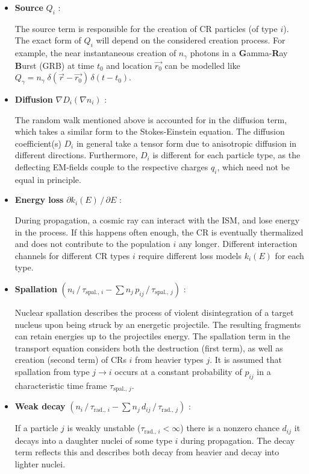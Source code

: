 \begin{itemize}
	\item \textbf{Source} $Q_i$ :

	The source term is responsible for the creation of CR particles (of type $i$). The exact form of $Q_i$ will depend on the considered creation process. For 
	example, the near instantaneous creation of $n_\gamma$ photons in a \textbf{G}amma-\textbf{R}ay \textbf{B}urst (GRB) at time $t_0$ and location $\vec{r_0}$ can 
	be modelled like $Q_\gamma = n_\gamma \; \delta(\vec{r} - \vec{r_0}) \, \delta(t - t_0)$.

	\item \textbf{Diffusion} $\nabla D_i \left( \nabla n_i \right)$ :

	The random walk mentioned above is accounted for in the diffusion term, which takes a similar form to the Stokes-Einstein equation. The diffusion 
	coefficient(s) $D_i$ in general take a tensor form due to anisotropic diffusion in different directions. Furthermore, $D_i$ is different for each particle 
	type, as the deflecting EM-fields couple to the respective charges $q_i$, which need not be equal in principle.

	\item \textbf{Energy loss} $\partial k_i(E)\,/\,\partial E$ :

	During propagation, a cosmic ray can interact with the ISM, and lose energy in the process. If this happens often enough, the CR is eventually thermalized and 
	does not contribute to the population $i$ any longer. Different interaction channels for different CR types $i$ require different loss models $k_i(E)$ for each 
	type. 

	\item \textbf{Spallation} $\left( n_i\,/\,\tau_{\text{spal.},\,i} - \sum n_j\,p_{ij}\,/\,\tau_{\text{spal.},\,j} \right)$ :

	Nuclear spallation describes the process of violent disintegration of a target nucleus upon being struck by an energetic projectile. The resulting fragments
	can retain energies up to the projectiles energy. The spallation term in the transport equation considers both the destruction (first term), as well as 
	creation (second term) of CRs $i$ from heavier types $j$. It is assumed that spallation from type $j \rightarrow i$ occurs at a constant probability of 
	$p_{ij}$ in a characteristic time frame $\tau_{\text{spal.},\,j}$.

	\item \textbf{Weak decay} $\left( n_i\,/\,\tau_{\text{rad.},\,i} - \sum n_j\,d_{ij}\,/\,\tau_{\text{rad.},\,j} \right)$ :

	If a particle $j$ is weakly unstable ($\tau_{\text{rad.},\,i} < \infty$) there is a nonzero chance $d_{ij}$ it decays into a daughter nuclei of some type $i$ 
	during propagation. The decay term reflects this and describes both decay from heavier and decay into lighter nuclei.
\end{itemize}

